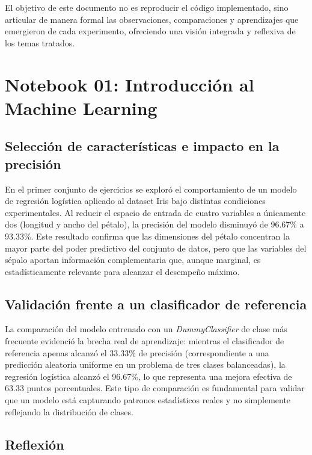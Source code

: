 \documentclass[12pt, a4paper]{article}
\begin{document}
El objetivo de este documento no es reproducir el código implementado, sino articular de manera formal las observaciones, comparaciones y aprendizajes que emergieron de cada experimento, ofreciendo una visión integrada y reflexiva de los temas tratados.

\section{Notebook 01: Introducción al Machine Learning}

\subsection{Selección de características e impacto en la precisión}

En el primer conjunto de ejercicios se exploró el comportamiento de un modelo de regresión logística aplicado al dataset Iris bajo distintas condiciones experimentales. Al reducir el espacio de entrada de cuatro variables a únicamente dos (longitud y ancho del pétalo), la precisión del modelo disminuyó de 96.67\% a 93.33\%. Este resultado confirma que las dimensiones del pétalo concentran la mayor parte del poder predictivo del conjunto de datos, pero que las variables del sépalo aportan información complementaria que, aunque marginal, es estadísticamente relevante para alcanzar el desempeño máximo.

\subsection{Validación frente a un clasificador de referencia}

La comparación del modelo entrenado con un \textit{DummyClassifier} de clase más frecuente evidenció la brecha real de aprendizaje: mientras el clasificador de referencia apenas alcanzó el 33.33\% de precisión (correspondiente a una predicción aleatoria uniforme en un problema de tres clases balanceadas), la regresión logística alcanzó el 96.67\%, lo que representa una mejora efectiva de 63.33 puntos porcentuales. Este tipo de comparación es fundamental para validar que un modelo está capturando patrones estadísticos reales y no simplemente reflejando la distribución de clases.

\subsection{Reflexión}
\end{document}
